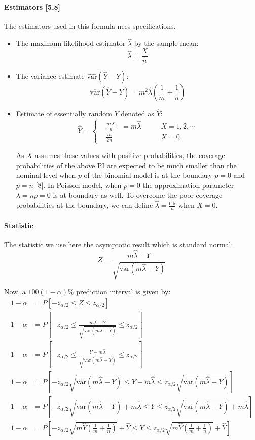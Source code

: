 \documentclass[a4paper]{article}
\begin{document}
\paragraph{Estimators [5,8]}
The estimators used in this formula nees specifications.
\begin{itemize}
\item The maximum-likelihood estimator $\widehat{\lambda}$ by the sample mean:
$$\widehat{\lambda} = \frac{X}{n}$$
\item The variance estimate $\widehat{\text{var}}(\widehat{Y}-Y)$:
$$\widehat{\text{var}}(\widehat{Y}-Y) = m^2\widehat{\lambda}(\frac{1}{m}+\frac{1}{n})$$
\item Estimate of essentially random $Y$ denoted as $\widehat{Y}$:
$$
\widehat{Y}=
\left\{
\begin{aligned}
&\frac{mX}{n}&=m\widehat{\lambda}\qquad & X=1,2,\cdots\\
&\frac{m}{2n}&  &X=0
\end{aligned}
\right.
$$

As $X$ assumes these values with positive probabilities, the coverage probabilities of the above PI are expected to be much smaller than the nominal level when $p$ of the binomial model is at the boundary $p=0$ and $p=n$ [8]. In Poisson model, when $p=0$ the approximation parameter $\lambda=np=0$ is at boundary as well. To overcome the poor coverage probabilities at the boundary, we can define $\widehat{\lambda}=\displaystyle\frac{0.5}{n}$ when $X=0$.
\end{itemize}

\paragraph{Statistic}
The statistic we use here the asymptotic result which is standard normal:
$$Z = \frac{m\widehat{\lambda}-Y}{\sqrt{\text{var}(m\widehat{\lambda}-Y)}}$$

Now, a $100(1-\alpha)\%$ prediction interval is given by:
\begin{align*}
1-\alpha &= P[-z_{\alpha/2} \leq Z \leq z_{\alpha/2}]\\
1-\alpha &= P[-z_{\alpha/2} \leq \frac{m\widehat{\lambda}-Y}{\sqrt{\text{var}(m\widehat{\lambda}-Y)}} \leq z_{\alpha/2}]\\
1-\alpha &= P[-z_{\alpha/2} \leq \frac{Y-m\widehat{\lambda}}{\sqrt{\text{var}(m\widehat{\lambda}-Y)}} \leq z_{\alpha/2}]\\
1-\alpha &= P[-z_{\alpha/2}\sqrt{\text{var}(m\widehat{\lambda}-Y)} \leq Y-m\widehat{\lambda} \leq z_{\alpha/2}\sqrt{\text{var}(m\widehat{\lambda}-Y)}]\\
1-\alpha &= P[-z_{\alpha/2}\sqrt{\text{var}(m\widehat{\lambda}-Y)} +m\widehat{\lambda} \leq Y \leq z_{\alpha/2}\sqrt{\text{var}(m\widehat{\lambda}-Y)}+m\widehat{\lambda}]\\
1-\alpha &= P[-z_{\alpha/2}\sqrt{m\widehat{Y}(\frac{1}{m}+\frac{1}{n})} +\widehat{Y} \leq Y \leq z_{\alpha/2}\sqrt{m\widehat{Y}(\frac{1}{m}+\frac{1}{n})}+\widehat{Y}]
\end{align*}
\end{document}
